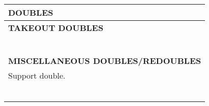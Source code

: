 \documentclass{article}
\newcommand{\+}{\textsuperscript{+}}
\begin{document}
\begin{adjustbox}{valign=t,minipage={90mm}}
\begin{tabular}{| p{88mm} |}
    \cellcolor[gray]{0.9} \textbf{DOUBLES} \\ \hline
    \textbf{TAKEOUT DOUBLES} \\ \hline
    \\
    \\
    \\
    \\
    \\
    \\
    \hline
    \textbf{MISCELLANEOUS DOUBLES/REDOUBLES} \\ \hline
    Support double.\\
    \\
    \\
    \\
    \\
    \\
    \rule{0pt}{14.3pt}\\
    \hline
  \end{tabular}
\end{adjustbox}
%
\begin{minipage}{5mm}
  \begin{tabular}{| p{5mm} |}
  \end{tabular}
\end{minipage}
%
\end{document}
